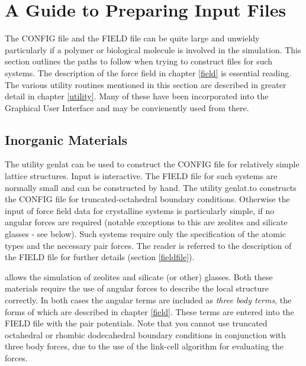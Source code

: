 
\section{A Guide to Preparing Input Files}

The CONFIG file and the FIELD file can be quite large and unwieldy
particularly if a polymer or biological molecule is involved in the
simulation. This section outlines the paths to follow when trying to
construct files for such systems. The description of the \D{} force
field in chapter \ref{field} is essential reading. The various utility
routines mentioned in this section are described in greater detail in
chapter \ref{utility}. Many of these have been incorporated into the
\D{} Graphical User Interface
\cite{smith-gui} and may be convienently used from there.

\subsection {Inorganic Materials}

The utility {\sc genlat} can be used to construct the CONFIG file for
relatively simple lattice structures. Input is interactive. The FIELD
file for such systems are normally small and can be constructed by
hand. The utility {\sc genlat.to} constructs the CONFIG file for
truncated-octahedral boundary conditions. Otherwise the input of force
field data for crystalline systems is particularly simple, if no
angular forces are required (notable exceptions to this are zeolites
and silicate glasses - see below). Such systems require only the
specification of the atomic types and the necessary pair forces. The
reader is referred to the description of the \D{} FIELD file
for further details (section \ref{fieldfile}).

\D{} allows the simulation of zeolites and silicate (or
other) glasses. Both these materials require the use of angular forces
to describe the local structure correctly. In both cases the angular
terms are included as {\em three body terms}, the forms of which are
described in chapter \ref{field}. These terms are entered into the FIELD file
with the pair potentials. Note that you cannot use truncated
octahedral or rhombic dodecahedral boundary conditions in conjunction with three body
forces, due to the use of the link-cell algorithm for evaluating the forces.

